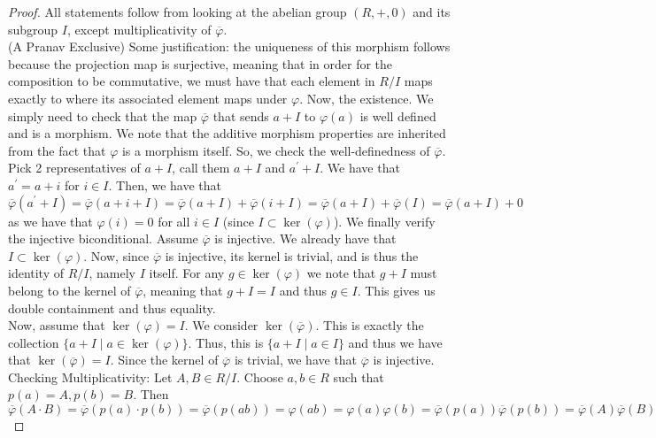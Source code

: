 \documentclass{amsart}
\theoremstyle{definition}
\theoremstyle{remark}
\begin{document}
\begin{proof}
    All statements follow from looking at the abelian group $(R, +, 0)$ and its
    subgroup $I$, except multiplicativity of $\overline{\varphi}$. \\
    (A Pranav Exclusive) Some justification:
    the uniqueness of this morphism follows because the projection map is surjective, meaning that in
    order for the composition to be commutative, we must have that each element in $R / I$ maps exactly
    to where its associated element maps under $\varphi$. Now, the existence. We simply need to check that
    the map $\overline{\varphi}$ that sends $a + I$ to $\varphi(a)$ is well defined and is a morphism. We note that
    the additive morphism properties are inherited from the fact that $\varphi$ is a morphism itself. So, we check
    the well-definedness of $\overline{\varphi}$. Pick 2 representatives of $a + I$, call them $a + I$ and
    $a^\prime + I$. We have that $a^\prime = a + i$ for $i \in I$. Then, we have that
    $$
    \overline{\varphi}(a^\prime + I) = \overline{\varphi}(a + i + I) = \overline{\varphi}(a + I) + \overline{\varphi}(i + I) =
    \overline{\varphi}(a + I) + \overline{\varphi}(I) = \overline{\varphi}(a + I) + 0
    $$
    as we have that $\varphi(i) = 0$ for all $i \in I$ (since $I \subset \ker(\varphi)$). We finally verify the injective
    biconditional. Assume $\overline{\varphi}$ is injective. We already have that $I \subset \ker(\varphi)$.
    Now, since $\overline{\varphi}$ is injective, its kernel is trivial, and is thus the identity of $R / I$, namely $I$ itself.
    For any $g \in \ker(\varphi)$ we note that $g + I$ must belong to the kernel of $\overline{\varphi}$, meaning that
    $g + I = I$ and thus $g \in I$. This gives us double containment and thus equality. \\
    Now, assume that $\ker(\varphi) = I$. We consider $\ker(\overline{\varphi})$. This is exactly the collection
    $\{a + I \mid a \in \ker(\varphi) \}$. Thus, this is $\{a + I \mid a \in I\}$ and thus we have that
    $\ker(\overline{\varphi}) = I$. Since the kernel of $\overline{\varphi}$ is trivial, we have that
    $\overline{\varphi}$ is injective. \\
    Checking Multiplicativity: Let $A,B \in R/I$. Choose $a,b \in R$ such that $p(a) = A, p(b) = B$. Then
    $$
    \overline{\varphi}(A \cdot B) = \overline{\varphi}(p(a)\cdot p(b)) =
    \overline{\varphi}(p(ab)) = \varphi(ab) = \varphi(a)\varphi(b) =
    \overline{\varphi}(p(a))\overline{\varphi}(p(b)) = \overline{\varphi}(A)\overline{\varphi}(B)
    $$
\end{proof}
\end{document}
